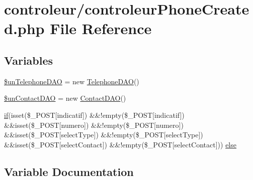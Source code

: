 \hypertarget{controleur_phone_created_8php}{}\section{controleur/controleur\+Phone\+Created.php File Reference}
\label{controleur_phone_created_8php}
\subsection*{Variables}
\begin{DoxyCompactItemize}
\item 
\hyperlink{controleur_phone_created_8php_a1b2e45ea5c826d646d858552518b5e04}{\$un\+Telephone\+D\+AO} = new \hyperlink{class_telephone_d_a_o}{Telephone\+D\+AO}()
\item 
\hyperlink{controleur_phone_created_8php_ae23482f65359aae22a7bead40e3b3cbc}{\$un\+Contact\+D\+AO} = new \hyperlink{class_contact_d_a_o}{Contact\+D\+AO}()
\item 
\hyperlink{controleur_create_phone_8php_ae87c4f53487f23ee9a965a6691be21d2}{if}(isset(\$\+\_\+\+P\+O\+ST\mbox{[}\textquotesingle{}indicatif\textquotesingle{}\mbox{]}) \&\&!empty(\$\+\_\+\+P\+O\+ST\mbox{[}\textquotesingle{}indicatif\textquotesingle{}\mbox{]}) \&\&isset(\$\+\_\+\+P\+O\+ST\mbox{[}\textquotesingle{}numero\textquotesingle{}\mbox{]}) \&\&!empty(\$\+\_\+\+P\+O\+ST\mbox{[}\textquotesingle{}numero\textquotesingle{}\mbox{]}) \&\&isset(\$\+\_\+\+P\+O\+ST\mbox{[}\textquotesingle{}select\+Type\textquotesingle{}\mbox{]}) \&\&!empty(\$\+\_\+\+P\+O\+ST\mbox{[}\textquotesingle{}select\+Type\textquotesingle{}\mbox{]}) \&\&isset(\$\+\_\+\+P\+O\+ST\mbox{[}\textquotesingle{}select\+Contact\textquotesingle{}\mbox{]}) \&\&!empty(\$\+\_\+\+P\+O\+ST\mbox{[}\textquotesingle{}select\+Contact\textquotesingle{}\mbox{]})) \hyperlink{controleur_phone_created_8php_ac5d677a8406c7038bd2957c712c11ddf}{else}
\end{DoxyCompactItemize}


\subsection{Variable Documentation}
\mbox{\label{controleur_phone_created_8php_ae23482f65359aae22a7bead40e3b3cbc}} 
